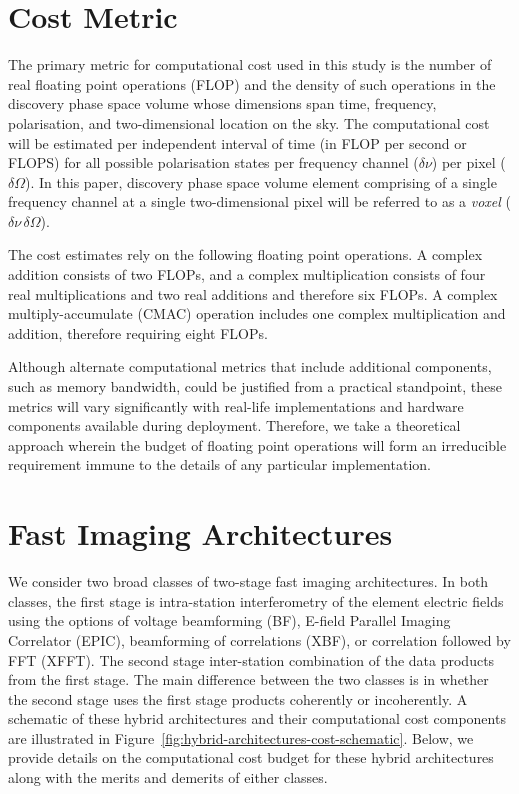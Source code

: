 \documentclass[
  journal=pasa,
  manuscript=article-type,
  year=2020,
  volume=37,
]{cup-journal}
\begin{document}
\section{Cost Metric} \label{sec:computational-cost}

The primary metric for computational cost used in this study is the number of real floating point operations (FLOP) and the density of such operations in the discovery phase space volume whose dimensions span time, frequency, polarisation, and two-dimensional location on the sky. The computational cost will be estimated per independent interval of time (in FLOP per second or FLOPS) for all possible polarisation states per frequency channel ($\delta\nu$) per pixel ($\delta\Omega$). In this paper, discovery phase space volume element comprising of a single frequency channel at a single two-dimensional pixel will be referred to as a \textit{voxel} ($\delta\nu\,\delta\Omega$).

The cost estimates rely on the following floating point operations. A complex addition consists of two FLOPs, and a complex multiplication consists of four real multiplications and two real additions and therefore six FLOPs. A complex multiply-accumulate (CMAC) operation includes one complex multiplication and addition, therefore requiring eight FLOPs.

Although alternate computational metrics that include additional components, such as memory bandwidth, could be justified from a practical standpoint, these metrics will vary significantly with real-life implementations and hardware components available during deployment. Therefore, we take a theoretical approach wherein the budget of floating point operations will form an irreducible requirement immune to the details of any particular implementation. 

\section{Fast Imaging Architectures} \label{sec:img-archs}


We consider two broad classes of two-stage fast imaging architectures. In both classes, the first stage is intra-station interferometry of the element electric fields using the options of voltage beamforming (BF), E-field Parallel Imaging Correlator (EPIC), beamforming of correlations (XBF), or correlation followed by FFT (XFFT). The second stage inter-station combination of the data products from the first stage. The main difference between the two classes is in whether the second stage uses the first stage products coherently or incoherently. A schematic of these hybrid architectures and their computational cost components are illustrated in Figure~\ref{fig:hybrid-architectures-cost-schematic}. Below, we provide details on the computational cost budget for these hybrid architectures along with the merits and demerits of either classes. 
\end{document}
